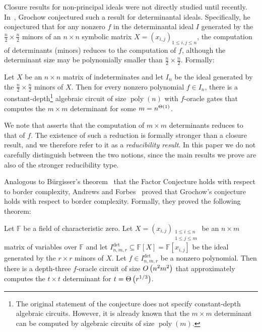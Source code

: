 \documentclass[10pt,a4paper]{amsart}
\newcommand*\Burgisser{B\"urgisser}
\DeclareMathOperator{\poly}{poly}
\newcommand*\F{\mathbb{F}}
\newcommand*\bigO[1]{%
    O\kern-0.0pt\left(#1\right)
}
\newcommand*\bigTheta[1]{%
    \Theta\kern-0.0pt\left(#1\right)
}
\begin{document}
Closure results for non-principal ideals were not directly studied until recently.
In~\cite{Grochow20}, Grochow conjectured such a result for determinantal ideals.
Specifically, he conjectured that for any nonzero $f$ in the determinantal ideal $I$ generated by the $\tfrac{n}{2} \times \tfrac{n}{2}$ minors of an $n \times n$ symbolic matrix $X = (x_{i,j})_{1 \leq i,j \leq n}$, the computation of determinants (minors) reduces to the computation of $f$, although the determinant size may be polynomially smaller than $\tfrac{n}{2} \times \tfrac{n}{2}$.
Formally:
\begin{conj}\label{conj:grochow_det}
Let $X$ be an $n \times n$ matrix of indeterminates and let $I_n$ be the ideal generated by the $\tfrac{n}{2} \times \tfrac{n}{2}$ minors of $X$.
Then for every nonzero polynomial $f \in I_n$, there is a constant-depth\footnote{The original statement of the conjecture does not specify constant-depth algebraic circuits. However, it is already known that the $m \times m$ determinant can be computed by algebraic circuits of size $\poly(m)$.} algebraic circuit of size $\poly(n)$ with $f$-oracle gates that computes the $m \times m$ determinant for some $m = n^{\bigTheta{1}}$.
\end{conj}

\begin{remark}
We note that  asserts that the computation of $m \times m$ determinants reduces to that of $f$.
The existence of such a reduction is formally stronger than a closure result, and we therefore refer to it as a \emph{reducibility result}.
In this paper we do not carefully distinguish between the two notions, since the main results we prove are also of the stronger reducibility type.
\end{remark}

Analogous to \Burgisser's theorem~\cite{Bur04} that the Factor Conjecture holds with respect to border complexity, Andrews and Forbes~\cite{AF21} proved that Grochow's conjecture holds with respect to border complexity.
Formally, they proved the following theorem:

\begin{thrm}[{\cite[Theorem~1.1]{AF21}}]\label{thrm:AF}
Let $\F$ be a field of characteristic zero.
Let $X = (x_{i,j})_{\substack{1 \leq i \leq n \\ 1 \leq j \leq m}}$ be an $n \times m$ matrix of variables over $\F$ and let $I^{\det}_{n,m,r} \subseteq \F[X] = \F[x_{i,j}]$ be the ideal generated by the $r \times r$ minors of $X$.
Let $f\in  I^{\det}_{n,m,r}$ be a nonzero polynomial.
Then there is a depth-three $f$-oracle circuit of size $\bigO{n^2 m^2}$ that approximately computes the $t \times t$ determinant for $t = \bigTheta{r^{1/3}}$.
\end{thrm}
\end{document}
